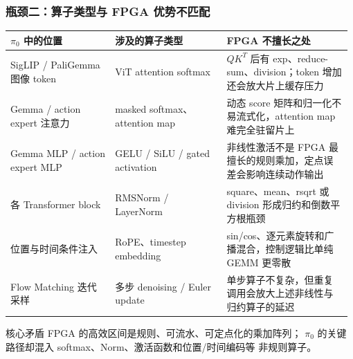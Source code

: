 \documentclass[10pt, aspectratio=169]{beamer}
\begin{document}
\begin{frame}
  \frametitle{瓶颈二：算子类型与 FPGA 优势不匹配}
  \footnotesize
  \begin{table}
    \setlength{\tabcolsep}{3pt}
    \renewcommand{\arraystretch}{1.25}
    \begin{tabular}{@{}p{0.3\linewidth}p{0.32\linewidth}p{0.36\linewidth}@{}}
      \toprule
      $\pi_0$ 中的位置                  & 涉及的算子类型                        & FPGA 不擅长之处                                           \\
      \midrule
      SigLIP / PaliGemma 图像 token   & ViT attention softmax          & $QK^T$ 后有 exp、reduce-sum、division；token 增加还会放大片上缓存压力 \\
      Gemma / action expert 注意力     & masked softmax、attention map   & 动态 score 矩阵和归一化不易流式化，attention map 难完全驻留片上           \\
      Gemma MLP / action expert MLP & GELU / SiLU / gated activation & 非线性激活不是 FPGA 最擅长的规则乘加，定点误差会影响连续动作输出                  \\
      各 Transformer block           & RMSNorm / LayerNorm            & square、mean、rsqrt 或 division 形成归约和倒数平方根瓶颈            \\
      位置与时间条件注入                     & RoPE、timestep embedding        & sin/cos、逐元素旋转和广播混合，控制逻辑比单纯 GEMM 更零散                  \\
      Flow Matching 迭代采样            & 多步 denoising / Euler update    & 单步算子不复杂，但重复调用会放大上述非线性与归约算子的延迟                        \\
      \bottomrule
    \end{tabular}
  \end{table}

  \vspace{3pt}
  \begin{block}{核心矛盾}
    FPGA 的高效区间是规则、可流水、可定点化的乘加阵列；
    $\pi_0$ 的关键路径却混入 softmax、Norm、激活函数和位置/时间编码等
    非规则算子。
  \end{block}
\end{frame}
\end{document}
